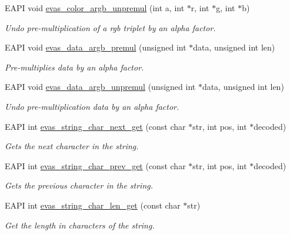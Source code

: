\begin{DoxyCompactItemize}
EAPI void \hyperlink{group__Evas__Utils_ga520b64aa41b81e13bf7fc9f16fd2f3e5}{evas\_\-color\_\-argb\_\-unpremul} (int a, int $\ast$r, int $\ast$g, int $\ast$b)
\begin{DoxyCompactList}\small\item\em Undo pre-\/multiplication of a rgb triplet by an alpha factor. \item\end{DoxyCompactList}\item 
EAPI void \hyperlink{group__Evas__Utils_gad61423a02fa7c3cb0293c3bdd5516216}{evas\_\-data\_\-argb\_\-premul} (unsigned int $\ast$data, unsigned int len)
\begin{DoxyCompactList}\small\item\em Pre-\/multiplies data by an alpha factor. \item\end{DoxyCompactList}\item 
EAPI void \hyperlink{group__Evas__Utils_ga6794135ce6545bd5e16f6563043a8f18}{evas\_\-data\_\-argb\_\-unpremul} (unsigned int $\ast$data, unsigned int len)
\begin{DoxyCompactList}\small\item\em Undo pre-\/multiplication data by an alpha factor. \item\end{DoxyCompactList}\item 
EAPI int \hyperlink{group__Evas__Utils_ga31161605cf449d16e0ea0183509a1e3b}{evas\_\-string\_\-char\_\-next\_\-get} (const char $\ast$str, int pos, int $\ast$decoded)
\begin{DoxyCompactList}\small\item\em Gets the next character in the string. \item\end{DoxyCompactList}\item 
EAPI int \hyperlink{group__Evas__Utils_ga20119def41aa1f24aea7961b3fa0fd72}{evas\_\-string\_\-char\_\-prev\_\-get} (const char $\ast$str, int pos, int $\ast$decoded)
\begin{DoxyCompactList}\small\item\em Gets the previous character in the string. \item\end{DoxyCompactList}\item 
EAPI int \hyperlink{group__Evas__Utils_gaf9edd726590b1f56ca3e566ba1a2dbb2}{evas\_\-string\_\-char\_\-len\_\-get} (const char $\ast$str)
\begin{DoxyCompactList}\small\item\em Get the length in characters of the string. \item\end{DoxyCompactList}\end{DoxyCompactItemize}


